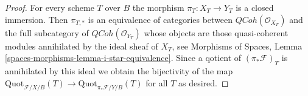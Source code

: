 \documentclass[10pt,a4paper]{amsart}
\theoremstyle{plain}
\theoremstyle{definition}
\theoremstyle{remark}
\numberwithin{equation}{subsection}
\def\QCoh{\mathit{QCoh}}
\def\Quotfunctor{\mathrm{Quot}}
\begin{document}
\begin{proof}
For every scheme $T$ over $B$ the morphism $\pi_T : X_T \to Y_T$
is a closed immersion. Then $\pi_{T, *}$ is an equivalence of
categories between $\QCoh(\mathcal{O}_{X_T})$ and the full subcategory
of $\QCoh(\mathcal{O}_{Y_T})$ whose objects are those quasi-coherent
modules annihilated by the ideal sheaf of $X_T$, see
Morphisms of Spaces, Lemma \ref{spaces-morphisms-lemma-i-star-equivalence}.
Since a qotient of
$(\pi_*\mathcal{F})_T$ is annihilated by this ideal we obtain the
bijectivity of the map
$\Quotfunctor_{\mathcal{F}/X/B}(T) \to \Quotfunctor_{\pi_*\mathcal{F}/Y/B}(T)$
for all $T$ as desired.
\end{proof}
\end{document}
